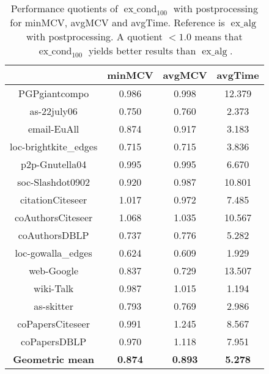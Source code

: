 \documentclass[pdftex]{llncs}
\newcommand{\excond}{\operatorname{ex\_cond}}
\newcommand{\exalg}{\operatorname{ex\_alg}}
\numberwithin{equation}{section}
\numberwithin{example}{section}
\numberwithin{table}{section}
\begin{document}
\begin{table}[tb]
  \caption{Performance quotients of $\excond_{100}$ with postprocessing for minMCV, avgMCV
    and avgTime. Reference is $\exalg$ with postprocessing. A quotient $< 1.0$ means that
    $\excond_{100}$ yields better results than $\exalg$.}
\begin{center}
\begin{tabular}{ c | c  c | c }
& minMCV  & avgMCV & avgTime\\
                        \hline \hline
PGPgiantcompo           &  0.986              &  0.998               &  12.379              \\ \hline
as-22july06             &  0.750              &  0.760               &   2.373              \\ \hline
email-EuAll             &  0.874              &  0.917               &   3.183              \\ \hline
loc-brightkite\_edges   &  0.715              &  0.715               &   3.836              \\ \hline
p2p-Gnutella04          &  0.995              &  0.995               &   6.670              \\ \hline
soc-Slashdot0902        &  0.920              &  0.987               &  10.801              \\ \hline
citationCiteseer        &  1.017              &  0.972               &   7.485              \\ \hline
coAuthorsCiteseer       &  1.068              &  1.035               &  10.567              \\ \hline 
coAuthorsDBLP           &  0.737              &  0.776               &   5.282              \\ \hline
loc-gowalla\_edges      &  0.624              &  0.609               &   1.929              \\ \hline
web-Google              &  0.837              &  0.729               &  13.507              \\ \hline
wiki-Talk               &  0.987              &  1.015               &   1.194              \\ \hline
as-skitter              &  0.793              &  0.769               &   2.986              \\ \hline
coPapersCiteseer        &  0.991              &  1.245               &   8.567              \\ \hline
coPapersDBLP            &  0.970              &  1.118               &   7.951              \\ \hline  \hline
\textbf{Geometric mean} &  \textbf{0.874}     &  \textbf{0.893}      &\textbf{5.278}        \\ \hline
\end{tabular}
\end{center}
\label{tab:MCV_100}
\end{table}
\end{document}
